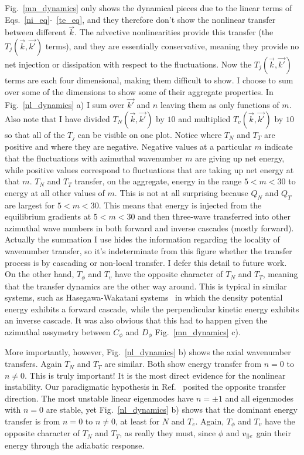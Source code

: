 Fig.~\ref{mn_dynamics} only shows the dynamical pieces due to the linear terms of Eqs.~\ref{ni_eq}-~\ref{te_eq}, and they therefore don't show the nonlinear transfer between different $\vec{k}$.
The advective nonlinearities provide this transfer (the $T_j(\vec{k},\vec{k'})$ terms), 
and they are essentially conservative, meaning they provide no net injection or dissipation with respect to the fluctuations. Now the $T_j(\vec{k},\vec{k'})$ terms are each four dimensional,
making them difficult to show. I choose to sum over some of the dimensions to show some of their aggregate properties. In Fig.~\ref{nl_dynamics} a) I sum over $\vec{k'}$ and $n$ leaving them
as only functions of $m$. Also note that I have divided $T_N(\vec{k},\vec{k'})$ by $10$ and multiplied $T_v(\vec{k},\vec{k'})$ by $10$ so that all of the $T_j$ can be visible on one plot.
Notice where $T_N$ and $T_T$ are positive and where they are negative. Negative values at a particular $m$ indicate that the fluctuations with azimuthal wavenumber $m$ are giving up net energy, 
while positive values correspond to fluctuations that are taking up net energy at that $m$. 
$T_N$ and $T_T$ transfer, on the aggregate, energy in the range $5 < m < 30$ to energy at all other values of $m$. This is not at all surprising because $Q_N$ and $Q_T$ are largest
for $5 < m < 30$. This means that energy is injected from the equilibrium gradients at $5 < m < 30$ and then three-wave transferred into other azimuthal wave numbers in both forward and inverse
cascades (mostly forward). 
Actually the summation I use hides the information regarding the locality of wavenumber transfer, so it's indeterminate from this figure whether the transfer process is by cascading or non-local transfer.
I defer this detail to future work. 
On the other hand, $T_\phi$ and $T_v$ have the opposite character of $T_N$ and $T_T$, meaning that the transfer dynamics are the other way around. This is typical in 
similar systems, such as Hasegawa-Wakatani systems~\cite{hasegawa1983,Camargo1995} in which the density potential energy exhibits a forward cascade, while the perpendicular kinetic energy
exhibits an inverse cascade. It was also obvious that this had to happen given the azimuthal assymetry between $C_\phi$ and $D_\phi$ Fig.~\ref{mn_dynamics} c).

More importantly, however, Fig.~\ref{nl_dynamics} b) shows the axial wavenumber transfers. Again $T_N$ and $T_T$ are similar. Both show energy transfer from $n=0$ to $n \ne 0$. This is truly important!
It is the most direct evidence for the nonlinear instability.
Our paradigmatic hypothesis in Ref.~\cite{Umansky2011} posited the opposite transfer direction. The most unstable linear eigenmodes have $n = \pm 1$ and all eigenmodes with $n=0$ are stable,
yet Fig.~\ref{nl_dynamics} b) shows that the dominant energy transfer is from $n=0$ to $n \ne 0$, at least for $N$ and $T_e$. Again, $T_\phi$ and $T_v$ have the opposite character of $T_N$ and $T_T$,
as really they must, since $\phi$ and $v_{\parallel e}$ gain their energy through the adiabatic response.

